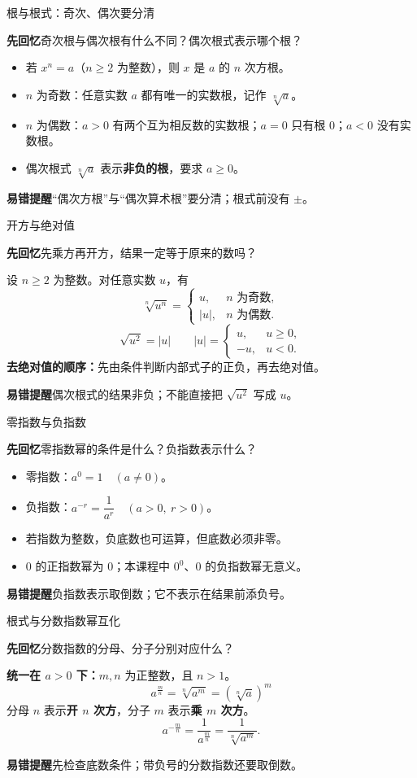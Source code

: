 \documentclass[UTF8,10pt,aspectratio=169,handout]{ctexbeamer}
\newcommand{\Recall}[1]{\par\noindent\textcolor{KnowledgeBlue}{\textbf{先回忆}\quad #1}\par\vspace{0.3cm}}
\newcommand{\Pitfall}[1]{\par\vspace{0.22cm}\noindent\textbf{易错提醒}\quad #1\par}
\begin{document}
\begin{frame}[t]{根与根式：奇次、偶次要分清}
\Recall{奇次根与偶次根有什么不同？偶次根式表示哪个根？}
\pause
\begin{itemize}
\item 若 $x^n=a$（$n\ge2$ 为整数），则 $x$ 是 $a$ 的 $n$ 次方根。
\item $n$ 为奇数：任意实数 $a$ 都有唯一的实数根，记作 $\sqrt[n]{a}$。
\item $n$ 为偶数：$a>0$ 有两个互为相反数的实数根；$a=0$ 只有根 $0$；$a<0$ 没有实数根。
\item 偶次根式 $\sqrt[n]{a}$ 表示\textbf{非负的根}，要求 $a\ge0$。
\end{itemize}
\Pitfall{“偶次方根”与“偶次算术根”要分清；根式前没有 $\pm$。}
\end{frame}

\begin{frame}[t]{开方与绝对值}
\Recall{先乘方再开方，结果一定等于原来的数吗？}
\pause
设 $n\ge2$ 为整数。对任意实数 $u$，有
\[
\sqrt[n]{u^n}=\begin{cases}u,&n\text{ 为奇数},\\ |u|,&n\text{ 为偶数}.\end{cases}
\]
\[
\boxed{\sqrt{u^2}=|u|}\qquad
|u|=\begin{cases}u,&u\ge0,\\-u,&u<0.\end{cases}
\]
\textbf{去绝对值的顺序：}先由条件判断内部式子的正负，再去绝对值。
\Pitfall{偶次根式的结果非负；不能直接把 $\sqrt{u^2}$ 写成 $u$。}
\end{frame}

\begin{frame}[t]{零指数与负指数}
\Recall{零指数幂的条件是什么？负指数表示什么？}
\pause
\begin{itemize}
\item 零指数：$\boxed{a^0=1\quad(a\ne0)}$。
\item 负指数：$\boxed{a^{-r}=\dfrac1{a^r}\quad(a>0,\ r>0)}$。
\item 若指数为整数，负底数也可运算，但底数必须非零。
\item $0$ 的正指数幂为 $0$；本课程中 $0^0$、$0$ 的负指数幂无意义。
\end{itemize}
\Pitfall{负指数表示取倒数；它不表示在结果前添负号。}
\end{frame}

\begin{frame}[t]{根式与分数指数幂互化}
\Recall{分数指数的分母、分子分别对应什么？}
\pause
\textbf{统一在 $a>0$ 下：}$m,n$ 为正整数，且 $n>1$。
\[
\boxed{a^{\frac mn}=\sqrt[n]{a^m}=(\sqrt[n]{a})^m}
\]
分母 $n$ 表示\textbf{开 $n$ 次方}，分子 $m$ 表示\textbf{乘 $m$ 次方}。
\[
a^{-\frac mn}=\frac1{a^{\frac mn}}=\frac1{\sqrt[n]{a^m}}.
\]
\Pitfall{先检查底数条件；带负号的分数指数还要取倒数。}
\end{frame}
\end{document}
